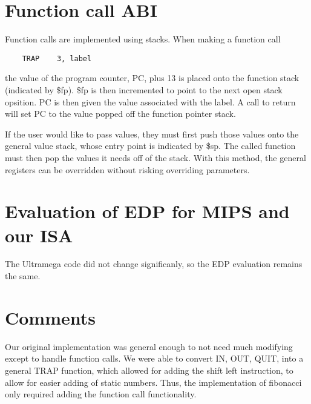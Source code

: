 \documentclass{article}
\begin{document}
\section{Function call ABI}
Function calls are implemented using stacks.  When making a function call
\begin{verbatim}
    TRAP    3, label
\end{verbatim}
the value of the program counter, PC, plus 13 is placed onto the function stack (indicated by \$fp).  \$fp is then incremented to point to the next open stack opsition.
PC is then given the value associated with the label.  
A call to return will set PC to the value popped off the function pointer stack.

If the user would like to pass values, they must first push those values onto the general value stack, whose entry point is indicated by \$sp.  
The called function must then pop the values it needs off of the stack.  With this method, the general registers can be overridden without risking overriding parameters.

\section{Evaluation of EDP for MIPS and our ISA}
The Ultramega code did not change significanly, so the EDP evaluation remains the same.


\section{Comments}
Our original implementation was general enough to not need much modifying except to handle function calls.  
We were able to convert IN, OUT, QUIT, into a general TRAP function, which allowed for adding the shift left instruction, to allow for easier adding of static numbers.
Thus, the implementation of fibonacci only required adding the function call functionality.
\end{document}
